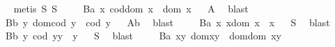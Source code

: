 \begin{isabellebody}
\isadelimproof
\ %
\endisadelimproof
%
\isatagproof
{}\isamarkupfalse%
\ {\isacharparenleft}metis\ S{}\ S{}{\isacharparenright}%
\endisatagproof
{\isafoldproof}%
%
\isadelimproof
%
\endisadelimproof
\isanewline
\ \ \ \isamarkupfalse%
\ B{}a{\isacharcolon}\ {\isachardoublequoteopen}\isactrlbold {\isasymforall}x{\isachardot}\ cod{\isacharparenleft}dom\ x{\isacharparenright}\ {\isasymcong}\ dom\ x{\isachardoublequoteclose}%
\isadelimproof
\ %
\endisadelimproof
%
\isatagproof
{}\isamarkupfalse%
\ A{}\ \isamarkupfalse%
\ blast%
\endisatagproof
{\isafoldproof}%
%
\isadelimproof
%
\endisadelimproof
\isanewline
\ \ \ \isamarkupfalse%
\ B{}b{\isacharcolon}\ {\isachardoublequoteopen}\isactrlbold {\isasymforall}y{\isachardot}\ dom{\isacharparenleft}cod\ y{\isacharparenright}\ {\isasymcong}\ cod\ y{\isachardoublequoteclose}%
\isadelimproof
\ %
\endisadelimproof
%
\isatagproof
{}\isamarkupfalse%
\ A{}b\ \isamarkupfalse%
\ blast%
\endisatagproof
{\isafoldproof}%
%
\isadelimproof
%
\endisadelimproof
\isanewline
\ \ \ \isamarkupfalse%
\ B{}a{\isacharcolon}\ {\isachardoublequoteopen}\isactrlbold {\isasymforall}x{\isachardot}\ x{\isasymcdot}{\isacharparenleft}dom\ x{\isacharparenright}\ {\isasymcong}\ x{\isachardoublequoteclose}%
\isadelimproof
\ %
\endisadelimproof
%
\isatagproof
{}\isamarkupfalse%
\ S{}\ \isamarkupfalse%
\ blast%
\endisatagproof
{\isafoldproof}%
%
\isadelimproof
%
\endisadelimproof
\isanewline
\ \ \ \isamarkupfalse%
\ B{}b{\isacharcolon}\ {\isachardoublequoteopen}\isactrlbold {\isasymforall}y{\isachardot}\ {\isacharparenleft}cod\ y{\isacharparenright}{\isasymcdot}y\ {\isasymcong}\ y{\isachardoublequoteclose}%
\isadelimproof
\ %
\endisadelimproof
%
\isatagproof
{}\isamarkupfalse%
\ S{}\ \isamarkupfalse%
\ blast%
\endisatagproof
{\isafoldproof}%
%
\isadelimproof
%
\endisadelimproof
\isanewline
\ \ \ \isamarkupfalse%
\ B{}a{\isacharcolon}\ {\isachardoublequoteopen}\isactrlbold {\isasymforall}x{\isachardot}\isactrlbold {\isasymforall}y{\isachardot}\ dom{\isacharparenleft}x{\isasymcdot}y{\isacharparenright}\ {\isasymcong}\ dom{\isacharparenleft}{\isacharparenleft}dom\ x{\isacharparenright}{\isasymcdot}y{\isacharparenright}{\isachardoublequoteclose}%
\isadelimproof
\ %
\endisadelimproof
%
\isatagproof
{}\isamarkupfalse%

\end{isabellebody}
